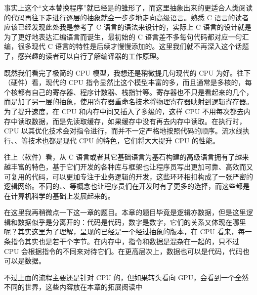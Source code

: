 事实上这个“文本替换程序”就已经是的雏形了，而这里抽象出来的更适合人类阅读的代码再往下走进行逐层的抽象就会一步步地走向高级语言。熟悉 C 语言的读者应该已经发现此处我是参考了 C 语言的语法来设计的，实际上 C 语言的设计就是为了更好地表达汇编语言而诞生，最初始的 C 语言差不多每句代码都对应一句汇编，很多现代 C 语言的特性是后续才慢慢添加的。这里我们就不再深入这个话题了，感兴趣的读者可以自行了解编译器的工作原理。

既然我们看完了极简的 CPU 模型，我想还是稍微提几句现代的 CPU 为好。往下（硬件）看，现代的 CPU 指令显然比这个模型丰富的多，而且通常是多核的，每个核都有自己的寄存器、程序计数器、栈指针等。寄存器也不只是看起来的几个，而是加了另一层的抽象，使用寄存器重命名技术将物理寄存器映射到逻辑寄存器。为了提升速度，在 CPU 和内存中间又插入了多级的，这样 CPU 不用每次都去内存中读取数据，而是先读取缓存，如果缓存中没有再去内存中读取。在执行时，CPU 以其优化技术会对指令进行，而并不一定严格地按照代码的顺序。流水线执行、、等技术也都是现代 CPU 的特色，它们将大大提升 CPU 的性能。

往上（软件）看，从 C 语言或者其它基础语言为基石构建的高级语言拥有了越来越丰富的特色，基于它们开发的各种库与框架也让程序员写出更加可靠、高效而又可复用的代码，可以更加专注于业务逻辑的开发，这些环环相扣构成了一张严密的逻辑网络。不同的、、等概念也让程序员们在开发时有了更多的选择，而这些都是在计算机科学的基础上发展起来的。

在这里我再稍微点一下这一章的题目。本章的题目毕竟是逻辑亦数据，但是这里逻辑和数据似乎是分离开的：代码是代码，数字是数字，它们的关系又体现在哪里呢？其实这里为了理解，呈现的已经是一个经过抽象的版本，在 CPU 看来，每一条指令其实也是若干个字节。在内存中，指令和数据是混杂在一起的，只不过 CPU 会根据指令的不同来对待它们。在更高层次上，数据也可以是代码，代码也可以是数据。

不过上面的流程主要还是针对 CPU 的，但如果转头看向 GPU，会看到一个全然不同的世界，这些内容放在本章的拓展阅读中

